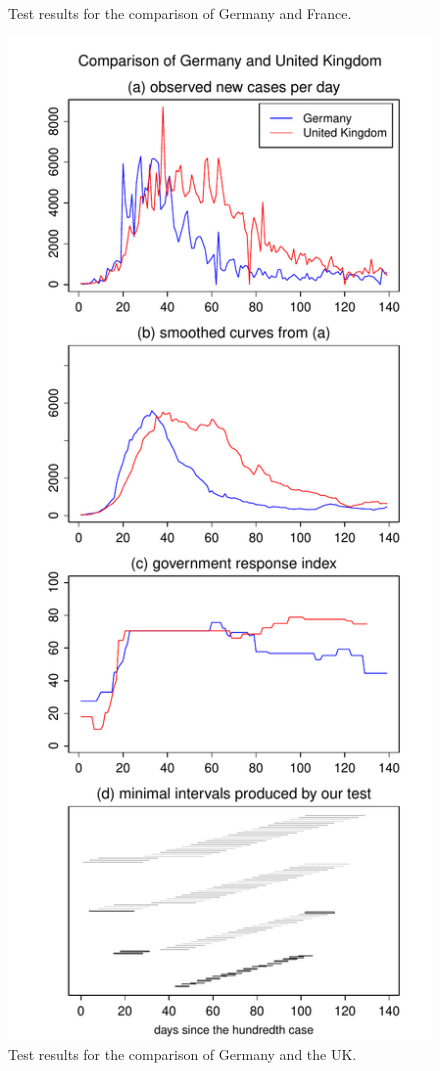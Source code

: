 \documentclass[a4paper,12pt]{article}
\numberwithin{equation}{section}
\begin{document}
\begin{figure}[p!]
\begin{minipage}[t]{0.49\textwidth}
\caption{Test results for the comparison of Germany and France.}\label{fig:Germany:France}
\end{minipage}
\hspace{0.25cm}
\begin{minipage}[t]{0.49\textwidth}
\includegraphics[width=\textwidth]{plots/DEU_vs_GBR}
\caption{Test results for the comparison of Germany and the UK.}\label{fig:Germany:UK}
\end{minipage}


\end{figure}
\end{document}
